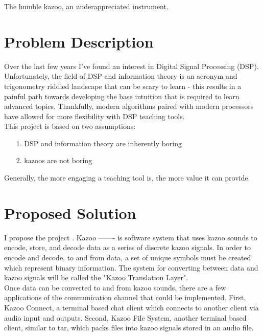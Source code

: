 \documentclass[]{article}
\begin{document}
\begin{center}
  The humble kazoo, an underappreciated instrument.
\end{center}

\section{Problem Description}

Over the last few years I've found an interest in Digital Signal Processing
(DSP). Unfortunately, the field of DSP and information theory is an acronym
and trigonometry riddled landscape that can be scary to learn - this results in a
painful path towards developing the base intuition that is required to learn
advanced topics. Thankfully, modern algorithms paired with modern processors
have allowed for more flexibility with DSP teaching tools. \\

This project is based on two assumptions:

\begin{itemize}
  \item[1.] DSP and information theory are inherently boring
  \item[2.] kazoos are not boring
\end{itemize}

Generally, the more engaging a teaching tool is, the more value it can provide.


\section{Proposed Solution}

I propose the project . Kazoo ------- is
software system that uses kazoo sounds to encode, store, and decode
data as a series of discrete kazoo signals. In order to encode and decode, to and from data, a set of unique symbols
must be created which represent binary information. The system for converting between data and kazoo signals will be called the "Kazoo Translation Layer". \\


Once data can be converted to and from kazoo sounds, there are a few applications of the communication channel that could be implemented. First, Kazoo Connect, a terminal based
chat client which connects to another client via audio input and outputs. Second, Kazoo File System, another terminal based client, similar to tar, which packs files into kazoo signals
stored in an audio file. \\
\end{document}
